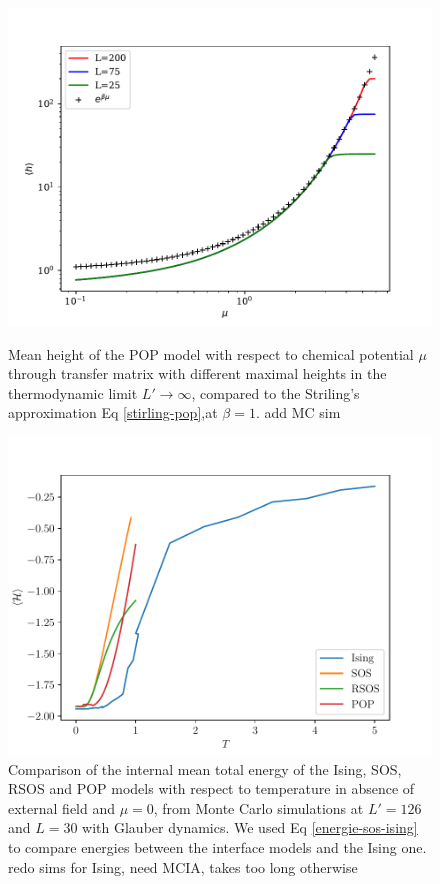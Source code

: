 \begin{figure}
\centering
\includegraphics{pop/hauteur-tm-pop.pdf}
\caption{Mean height of the POP model with respect to chemical potential $\mu$ through transfer matrix with different maximal heights in the thermodynamic limit $L'\to \infty$, compared to the Striling's approximation Eq \eqref{stirling-pop},at $\beta=1$. {\color{red} add MC sim}}
\label{haut-tm-pop} 
\includegraphics{pop/comparaison-modeles.pdf}
\caption{Comparison of the internal mean total energy of the Ising, SOS, RSOS and POP models with respect to temperature in absence of external field and $\mu=0$, from Monte Carlo simulations at $L'=126$ and $L=30$ with Glauber dynamics. We used Eq \ref{energie-sos-ising} to compare energies between the interface models and the Ising one.
{\color{red} redo sims for Ising, need MCIA, takes too long otherwise}}
\label{comp-models}
\end{figure}

